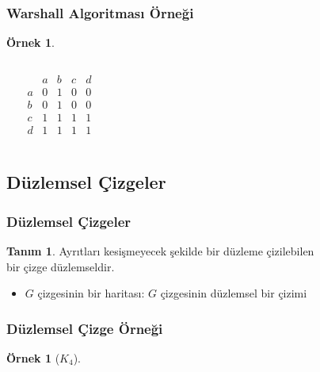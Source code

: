 \documentclass[dvipsnames]{beamer}
\theoremstyle{definition}
\newtheorem{tanim}[theorem]{Tanım}
\theoremstyle{example}
\newtheorem{ornek}[theorem]{Örnek}
\theoremstyle{plain}
\begin{document}
\begin{frame}
  \frametitle{Warshall Algoritması Örneği}

  \begin{ornek}
    \begin{columns}
      \begin{center}
      \end{center}

      \[
        \begin{array}{c|cccc}
              & a & b & c & d\\\hline
            a & 0 & 1 & 0 & 0\\
            b & 0 & 1 & 0 & 0\\
            c & 1 & 1 & 1 & 1\\
            d & 1 & 1 & 1 & 1
        \end{array}
      \]
    \end{columns}
  \end{ornek}
\end{frame}

\subsection{Düzlemsel Çizgeler}

\begin{frame}
  \frametitle{Düzlemsel Çizgeler}

  \begin{tanim}
    Ayrıtları kesişmeyecek şekilde bir düzleme çizilebilen\\
    bir çizge \alert{düzlemseldir}.
  \end{tanim}

  \begin{itemize}
    \item $G$ çizgesinin bir \alert{haritası}: $G$ çizgesinin düzlemsel bir
      çizimi
  \end{itemize}
\end{frame}

\begin{frame}
  \frametitle{Düzlemsel Çizge Örneği}

  \begin{ornek}[$K_4$]
    \begin{columns}
      \begin{center}
      \end{center}

      \begin{center}
      \end{center}
    \end{columns}
  \end{ornek}
\end{frame}
\end{document}
